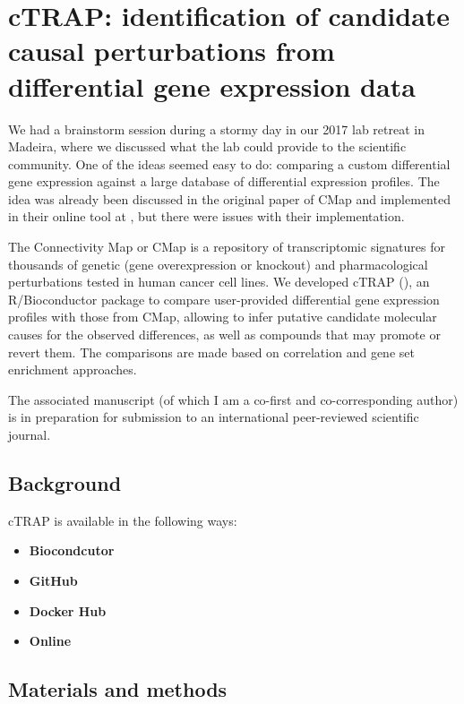 \chapter{cTRAP: identification of candidate causal perturbations from differential gene expression data}
\label{chap:ctrap}

We had a brainstorm session during a stormy day in our 2017 lab retreat in Madeira, where we discussed what the lab could provide to the scientific community. One of the ideas seemed easy to do: comparing a custom differential gene expression against a large database of differential expression profiles. The idea was already been discussed in the original paper of CMap and implemented in their online tool at , but there were issues with their implementation.

The Connectivity Map or CMap \cite{subramanian:2017ul} is a repository of transcriptomic signatures for thousands of genetic (gene overexpression or knockout) and pharmacological perturbations tested in human cancer cell lines. We developed cTRAP (), an R/Bioconductor package to compare user-provided differential gene expression profiles with those from CMap, allowing to infer putative candidate molecular causes for the observed differences, as well as compounds that may promote or revert them. The comparisons are made based on correlation and gene set enrichment \cite{subramanian:2005wu} approaches.

The associated manuscript (of which I am a co-first and co-corresponding author) is in preparation for submission to an international peer-reviewed scientific journal.

\section{Background}

cTRAP is available in the following ways:

\begin{itemize}
	\item \textbf{Biocondcutor}
	\item \textbf{GitHub}
	\item \textbf{Docker Hub}
	\item \textbf{Online}
\end{itemize}

\section{Materials and methods}

